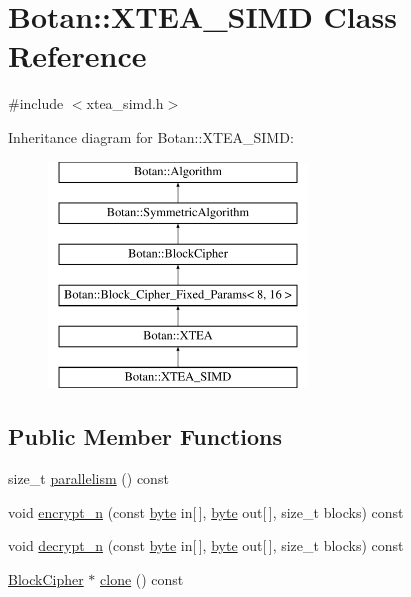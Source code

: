 \hypertarget{classBotan_1_1XTEA__SIMD}{\section{Botan\-:\-:X\-T\-E\-A\-\_\-\-S\-I\-M\-D Class Reference}
\label{classBotan_1_1XTEA__SIMD}
}


{\ttfamily \#include $<$xtea\-\_\-simd.\-h$>$}

Inheritance diagram for Botan\-:\-:X\-T\-E\-A\-\_\-\-S\-I\-M\-D\-:\begin{figure}[H]
\begin{center}
\leavevmode
\includegraphics[height=6.000000cm]{classBotan_1_1XTEA__SIMD}
\end{center}
\end{figure}
\subsection*{Public Member Functions}
\begin{DoxyCompactItemize}
\item 
size\-\_\-t \hyperlink{classBotan_1_1XTEA__SIMD_a844069bae910399d2d2632ae1f419a6b}{parallelism} () const 
\item 
void \hyperlink{classBotan_1_1XTEA__SIMD_abba1f0478dee131f80bff4c63c3b07e8}{encrypt\-\_\-n} (const \hyperlink{namespaceBotan_a7d793989d801281df48c6b19616b8b84}{byte} in\mbox{[}$\,$\mbox{]}, \hyperlink{namespaceBotan_a7d793989d801281df48c6b19616b8b84}{byte} out\mbox{[}$\,$\mbox{]}, size\-\_\-t blocks) const 
\item 
void \hyperlink{classBotan_1_1XTEA__SIMD_a00ee778c3e753e84af180f14ae441b96}{decrypt\-\_\-n} (const \hyperlink{namespaceBotan_a7d793989d801281df48c6b19616b8b84}{byte} in\mbox{[}$\,$\mbox{]}, \hyperlink{namespaceBotan_a7d793989d801281df48c6b19616b8b84}{byte} out\mbox{[}$\,$\mbox{]}, size\-\_\-t blocks) const 
\item 
\hyperlink{classBotan_1_1BlockCipher}{Block\-Cipher} $\ast$ \hyperlink{classBotan_1_1XTEA__SIMD_a543af6f76eb321b393f3d6b5aa2c6a75}{clone} () const 
\end{DoxyCompactItemize}
